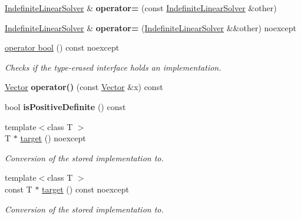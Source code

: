 \begin{DoxyCompactItemize}
\item 
\hyperlink{classSpacy_1_1IndefiniteLinearSolver}{Indefinite\+Linear\+Solver} \& {\bfseries operator=} (const \hyperlink{classSpacy_1_1IndefiniteLinearSolver}{Indefinite\+Linear\+Solver} \&other)\hypertarget{classSpacy_1_1IndefiniteLinearSolver_a45976eb9a9a9884fabdcb121807d944f}{}\label{classSpacy_1_1IndefiniteLinearSolver_a45976eb9a9a9884fabdcb121807d944f}

\item 
\hyperlink{classSpacy_1_1IndefiniteLinearSolver}{Indefinite\+Linear\+Solver} \& {\bfseries operator=} (\hyperlink{classSpacy_1_1IndefiniteLinearSolver}{Indefinite\+Linear\+Solver} \&\&other) noexcept\hypertarget{classSpacy_1_1IndefiniteLinearSolver_a9545a7e978179a546525b18a16b8ae61}{}\label{classSpacy_1_1IndefiniteLinearSolver_a9545a7e978179a546525b18a16b8ae61}

\item 
\hyperlink{classSpacy_1_1IndefiniteLinearSolver_a4ef57ec75c5f8cf611a99e80fe1a492d}{operator bool} () const noexcept
\begin{DoxyCompactList}\small\item\em Checks if the type-\/erased interface holds an implementation. \end{DoxyCompactList}\item 
\hyperlink{classSpacy_1_1Vector}{Vector} {\bfseries operator()} (const \hyperlink{classSpacy_1_1Vector}{Vector} \&x) const \hypertarget{classSpacy_1_1IndefiniteLinearSolver_a150a854c97a44c1c53c4aa071e1b8b12}{}\label{classSpacy_1_1IndefiniteLinearSolver_a150a854c97a44c1c53c4aa071e1b8b12}

\item 
bool {\bfseries is\+Positive\+Definite} () const \hypertarget{classSpacy_1_1IndefiniteLinearSolver_a04191e6ed2c8cd54870c79a919dcae39}{}\label{classSpacy_1_1IndefiniteLinearSolver_a04191e6ed2c8cd54870c79a919dcae39}

\item 
{\footnotesize template$<$class T $>$ }\\T $\ast$ \hyperlink{classSpacy_1_1IndefiniteLinearSolver_a6c0daed405c2671c8957848d731c0a1f}{target} () noexcept
\begin{DoxyCompactList}\small\item\em Conversion of the stored implementation to. \end{DoxyCompactList}\item 
{\footnotesize template$<$class T $>$ }\\const T $\ast$ \hyperlink{classSpacy_1_1IndefiniteLinearSolver_a82c21063fa0c4b354d3e86db26ef125a}{target} () const noexcept
\begin{DoxyCompactList}\small\item\em Conversion of the stored implementation to. \end{DoxyCompactList}\end{DoxyCompactItemize}


